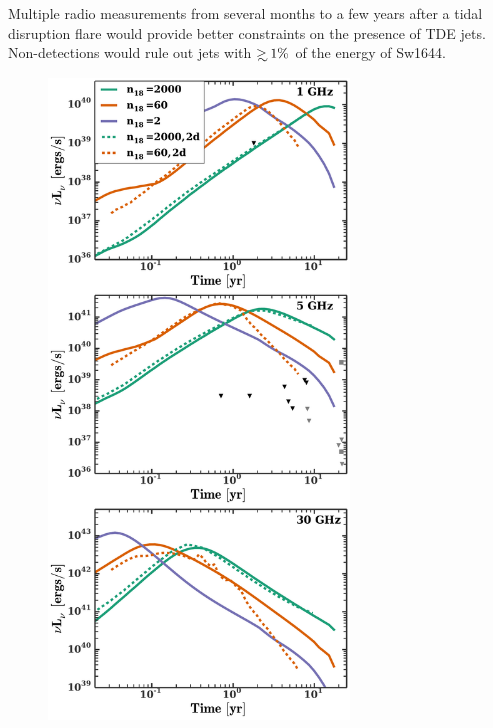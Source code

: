 \documentclass[usenatbib,fleqn]{mnras}
\newcommand\gsim{\mathrel{\rlap{\lower4pt\hbox{\hskip1pt$\sim$}}
    \raise1pt\hbox{$>$}}}
\begin{document}
Multiple radio measurements from several months to a few years after a
tidal disruption flare would provide better constraints on the
presence of TDE jets. Non-detections would rule out jets with $\gsim
1\%$ of the energy of Sw1644.



\begin{figure} 
  \includegraphics[width=8cm]{lightcurves.pdf}

\end{figure}
\end{document}

